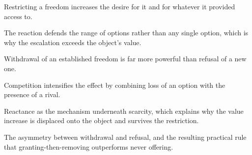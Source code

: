 

\begin{distilled}
  \item Restricting a freedom increases the desire for it and for whatever it provided access to.
  \item The reaction defends the range of options rather than any single option, which is why the escalation exceeds the object's value.
  \item Withdrawal of an established freedom is far more powerful than refusal of a new one.
  \item Competition intensifies the effect by combining loss of an option with the presence of a rival.
\end{distilled}

\begin{unique}
  \item Reactance as the mechanism underneath scarcity, which explains why the value increase is displaced onto the object and survives the restriction.
  \item The asymmetry between withdrawal and refusal, and the resulting practical rule that granting-then-removing outperforms never offering.
\end{unique}
